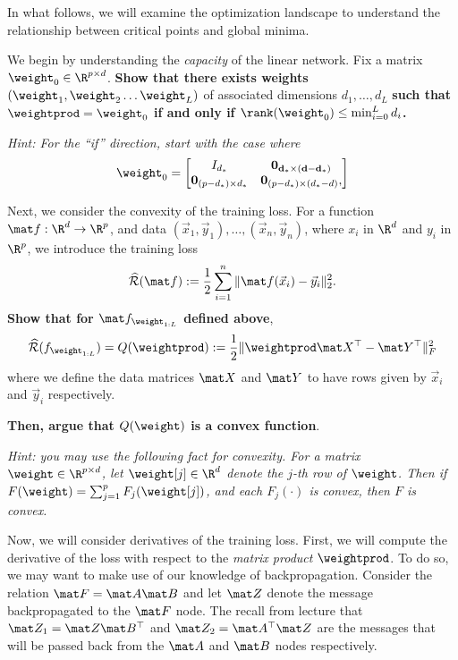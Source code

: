 \documentclass[preview]{standalone}
\begin{document}
In what follows, we will examine the optimization landscape to understand the relationship between critical points and global minima.
\begin{Parts}
\Part
	We begin by understanding the \emph{capacity} of the linear network.
	Fix a matrix $\weight_0 \in \R^{p\times d}$. \textbf{Show that there exists weights} $(\weight_1, \weight_{2} \dots \weight_{L})$ of associated dimensions $d_1,\dots,d_L$ \textbf{such that $\weightprod  = \weight_0 $ if and only if $\rank(\weight_0) \le \min_{i=0}^L d_i$.} 

	\emph{Hint: For the ``if'' direction, start with the case where 
	\begin{align*}
	\weight_0 = \begin{bmatrix} I_{d_*} & \mathbf{0_{d_* \times (d - d_*)}} \\
\mathbf{0}_{(p - d_*) \times d_*} & \mathbf{0}_{(p - d_*) \times (d_*-d)},
\end{bmatrix}
	\end{align*} }

	


\Part
Next, we consider the convexity of the training loss.
\newcommand{\riskhat}{\widehat{\mathcal{R}}}
For a function $\mat f: \R^{d} \to \R^p$, and data $(\vec x_1,\vec y_1),\dots,(\vec x_n,\vec y_n)$, where $x_i$ in $\R^{d}$ and $y_i$ in $\R^{p}$, we introduce the training loss
\begin{align*}
\riskhat(\mat f) := \frac{1}{2}\sum_{i=1}^n\|\mat f(\vec x_i) - \vec y_i\|_2^2. 
\end{align*}
\textbf{Show that for $\mat f_{\weight_{1:L}}$ defined above},
\begin{align*}
\riskhat(f_{\weight_{1:L}}) = Q(\weightprod) := \frac{1}{2}\|\weightprod\mat X^\top  - \mat Y^\top\|_F^2
\end{align*}
where we define the data matrices $\mat X$ and $\mat Y$ to have rows given by $\vec x_i$ and $\vec y_i$ respectively.

\textbf{Then, argue that $Q(\weight)$ is a convex function}.

\emph{Hint: you may use the following fact for convexity. For a matrix $\weight \in \R^{p \times d}$, let $\weight[j] \in \R^{d}$ denote the $j$-th row of $\weight$. Then if $F(\weight) = \sum_{j=1}^p F_j(\weight[j])$, and each $F_j(\cdot)$ is convex, then $F$ is convex.} 





\Part
Now, we will consider derivatives of the training loss. First, we will compute the derivative of the loss with respect to the \emph{matrix product} $\weightprod$.
To do so, we may want to make use of our knowledge of backpropagation. Consider the relation $\mat F = \mat A \mat B$ and let $\mat Z$ denote the message backpropagated to the $\mat F$ node. The recall from lecture that 
$\mat Z_1 = \mat Z \mat B^\top $ and $\mat Z_2 = \mat A^\top\mat Z$ are the messages that will be passed back from the $\mat A$ and $\mat B$ nodes respectively. 


\end{Parts}
\end{document}
